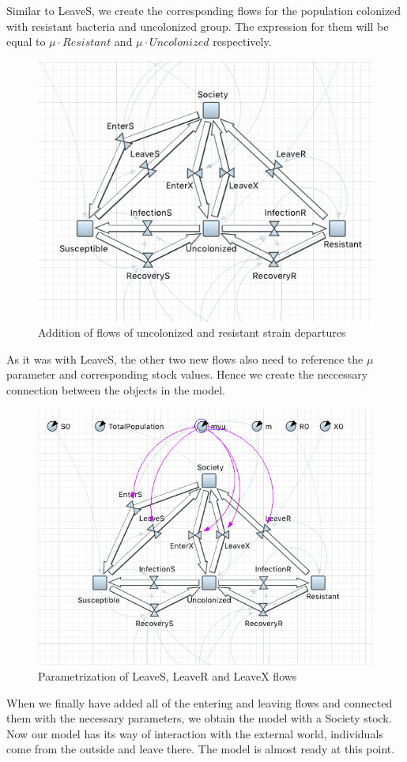 Similar to LeaveS, we create the corresponding flows for the population colonized with resistant bacteria and uncolonized group. The expression for them will be equal to $\mu \cdot Resistant$ and $\mu \cdot Uncolonized$ respectively.

\begin{figure}[H]
  \centering
  \includegraphics[height=0.5\textwidth]{img/screens/society/society15}
  \caption{Addition of flows of uncolonized and resistant strain departures}
\end{figure}

As it was with LeaveS, the other two new flows also need to reference the $\mu$ parameter and corresponding stock values. Hence we create the neccessary connection between the objects in the model.

\begin{figure}[H]
  \centering
  \includegraphics[height=0.5\textwidth]{img/screens/society/society14}
  \caption{Parametrization of LeaveS, LeaveR and LeaveX flows}
\end{figure}

When we finally have added all of the entering and leaving flows and connected them with the necessary parameters, we obtain the model with a Society stock. Now our model has its way of interaction with the external world, individuals come from the outside and leave there. The model is almost ready at this point.

